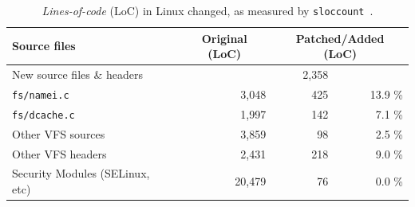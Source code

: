 \begin{table}[t]
\scriptsize
\centering
\begin{tabular}{p{1.8in}rrr}
Source files & \multicolumn{1}{c}{Original (LoC)} & \multicolumn{2}{c}{Patched/Added (LoC)} \\
\hline
New source files \& headers  & & 2,358 & \\
\hline
{\tt fs/namei.c}   & 3,048 & 425 & 13.9 \% \\
\hline
{\tt fs/dcache.c}  & 1,997 & 142 &  7.1 \% \\
\hline
Other VFS sources  & 3,859 &  98 &  2.5 \% \\
\hline
Other VFS headers  & 2,431 & 218 &  9.0 \% \\
\hline
Security Modules (SELinux, etc)   & 20,479 & 76 & 0.0 \% \\
\hline
\end{tabular}
\caption[Directory cache optimization: lines-of-code in Linux changed.]
{{\em Lines-of-code} (LoC) in Linux changed, as measured by {\tt sloccount}~\citep{sloccount}.}
\label{tab:dcache:loc}
\end{table}

